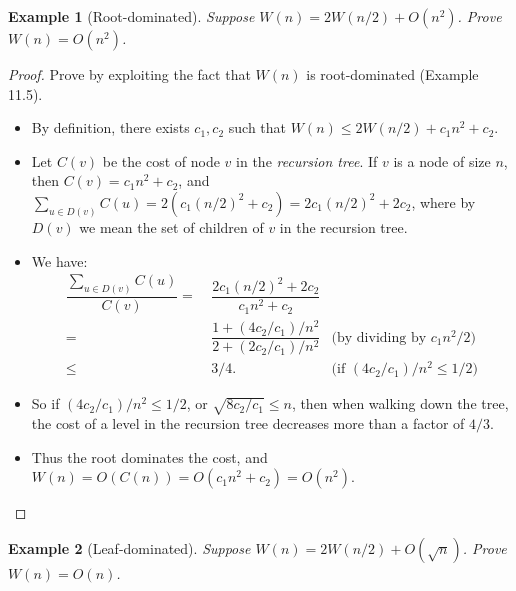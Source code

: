 \documentclass[11pt,a4paper,oneside,microtype,nokorean]{oblivoir}
\newtheorem{example}{Example}
\begin{document}
\begin{example}[Root-dominated] Suppose $W(n) = 2W(n/2) + O(n^2)$.  Prove $W(n) = O(n^2)$.
\end{example}

\begin{proof}
  Prove by exploiting the fact that $W(n)$ is root-dominated (Example 11.5).

  \begin{itemize}
  \item By definition, there exists $c_1,c_2$ such that $W(n) \le 2W(n/2) + c_1 n^2 + c_2.$
  \item Let $C(v)$ be the cost of node $v$ in the \emph{recursion tree}.  If $v$ is a node of size
    $n$, then $C(v) = c_1 n^2 + c_2$, and
    $\sum_{u \in D(v)} C(u) = 2(c_1 (n/2)^2 + c_2) = 2 c_1 (n/2)^2 + 2 c_2$, where by $D(v)$ we mean
    the set of children of $v$ in the recursion tree.
  \item We have:
    \begin{align*}
      \dfrac{\sum_{u \in D(v)} C(u)}{C(v)}
      = &~ \dfrac{2 c_1 (n/2)^2 + 2 c_2}{c_1 n^2 + c_2} \\
      = &~ \dfrac{1 + (4 c_2 / c_1) / n^2}{2 + (2 c_2 / c_1) / n^2} & \mbox{(by dividing by $c_1 n^2 / 2$)} \\
      \le &~ 3/4. & \mbox{(if $(4 c_2 / c_1) / n^2 \le 1/2$)}
    \end{align*}
  \item So if $(4 c_2 / c_1) / n^2 \le 1/2$, or $\sqrt{8 c_2 / c_1} \le n$, then when walking down
    the tree, the cost of a level in the recursion tree decreases more than a factor of $4/3$.
  \item Thus the root dominates the cost, and $W(n) = O(C(n)) = O(c_1 n^2 + c_2) = O(n^2)$.
  \end{itemize}
\end{proof}


\begin{example}[Leaf-dominated] Suppose $W(n) = 2W(n/2) + O(\sqrt{n})$.  Prove $W(n) = O(n)$.
\end{example}
\end{document}
